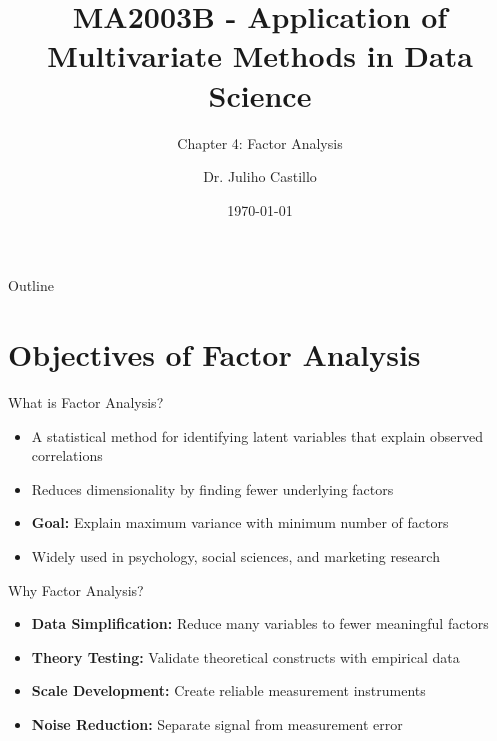 \documentclass[aspectratio=169]{beamer}
\title[Factor Analysis]{MA2003B - Application of Multivariate Methods in Data Science}
\subtitle{Chapter 4: Factor Analysis}
\author{Dr. Juliho Castillo}
\institute{Tec de Monterrey}
\date{\today}
\begin{document}
\begin{frame}
  \titlepage
\end{frame}

\begin{frame}{Outline}
  \tableofcontents
\end{frame}


\section{Objectives of Factor Analysis}
\begin{frame}
  \sectionpage
\end{frame}

\begin{frame}{What is Factor Analysis?}
  \begin{itemize}
    \item A statistical method for identifying latent variables that explain observed correlations
    \item Reduces dimensionality by finding fewer underlying factors
    \item \textbf{Goal:} Explain maximum variance with minimum number of factors
    \item Widely used in psychology, social sciences, and marketing research
  \end{itemize}
\end{frame}

\begin{frame}{Why Factor Analysis?}
  \begin{itemize}
    \item \textbf{Data Simplification:} Reduce many variables to fewer meaningful factors
    \item \textbf{Theory Testing:} Validate theoretical constructs with empirical data
    \item \textbf{Scale Development:} Create reliable measurement instruments
    \item \textbf{Noise Reduction:} Separate signal from measurement error
  \end{itemize}
\end{frame}
\end{document}
